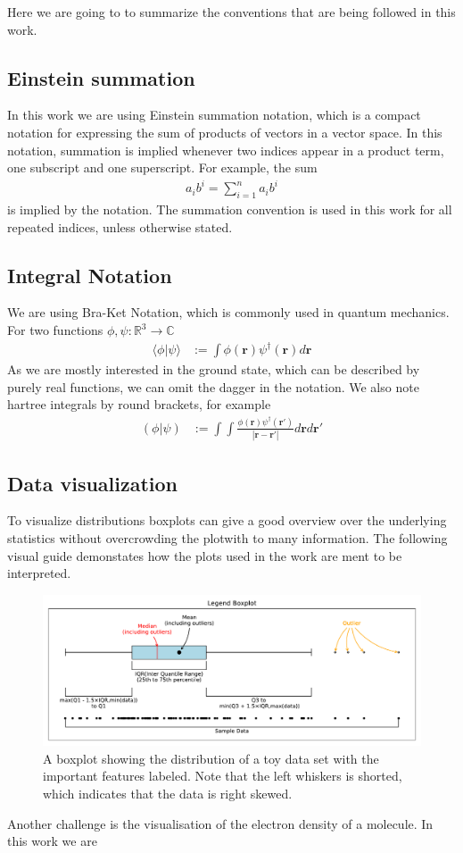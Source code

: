 Here we are going to to summarize the conventions that are being followed in this work.
\subsection{Einstein summation}
In this work we are using Einstein summation notation, which is a compact notation for expressing the sum of products of vectors in a vector space. In this notation, summation is implied whenever two indices appear in a product term, one subscript and one superscript. For example, the sum
\begin{align}
    a_i b^i = \sum_{i=1}^n a_i b^i
\end{align}
is implied by the notation. The summation convention is used in this work for all repeated indices, unless otherwise stated.
\subsection{Integral Notation}\label{integral_notation}
We are using Bra-Ket Notation, which is commonly used in quantum mechanics. For two functions $\phi,\psi:\mathbb{R}^3\rightarrow \mathbb{C}$
\begin{align}
    \langle \phi | \psi\rangle &:= \int \phi(\mathbf r)\psi^\dagger(\mathbf r) d\mathbf r
\end{align}
As we are mostly interested in the ground state, which can be described by purely real functions, we can omit the dagger in the notation.
We also note hartree integrals by round brackets, for example
\begin{align}
    (\phi | \psi) &:= \int \int \frac{\phi(\mathbf r)\psi^\dagger(\mathbf r')}{|\mathbf{r}-\mathbf{r'}|} d\mathbf rd\mathbf {r'}
\end{align}
\subsection{Data visualization}\label{boxplots}
To visualize distributions boxplots can give a good overview over the underlying statistics without overcrowding the plotwith to many information. The following visual guide demonstates how the plots used in the work are ment to be interpreted.
\begin{figure}[H]
    \centering
    \includegraphics[width=1.\textwidth]{chapters/foundations/images_foundation/legend_boxplot}
    \caption{A boxplot showing the distribution of a toy data set with the important features labeled. Note that the left whiskers is shorted, which indicates that the data is right skewed.}
\end{figure}
Another challenge is the visualisation of the electron density of a molecule. In this work we are